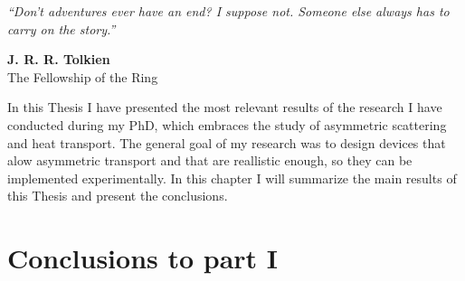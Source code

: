 
\label{Conclusions}
\null
\textit{``Don't adventures ever have an end? I suppose not. Someone else always has to carry on the story.''}
\begin{flushright}
  {\bf J. R. R. Tolkien}\\
  The Fellowship of the Ring
\end{flushright}
\null

In this Thesis I have presented the most relevant results of the research I have conducted during my PhD, which embraces the study of asymmetric scattering and heat transport. The general goal of my research was to design devices that alow asymmetric transport and that are reallistic enough, so they can be implemented experimentally. In this chapter I will summarize the main results of this Thesis and present the conclusions.



\section*{Conclusions to part I}

